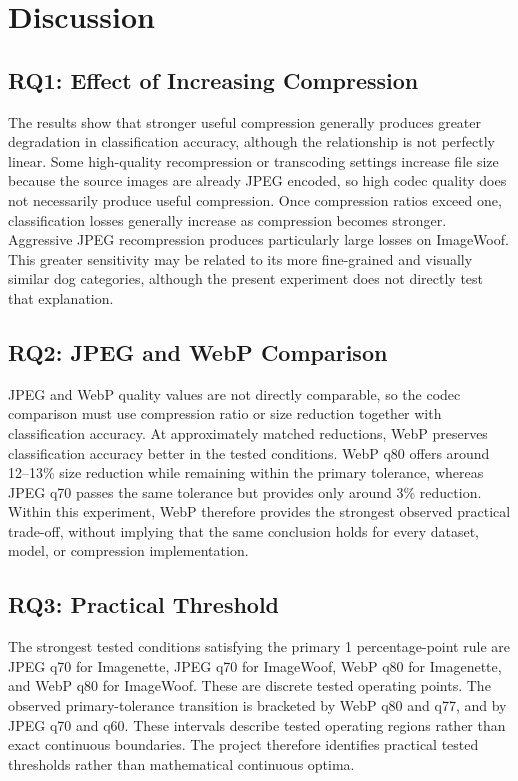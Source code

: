 \section{Discussion}

\subsection{RQ1: Effect of Increasing Compression}

The results show that stronger useful compression generally produces greater degradation in classification accuracy, although the relationship is not perfectly linear. Some high-quality recompression or transcoding settings increase file size because the source images are already JPEG encoded, so high codec quality does not necessarily produce useful compression. Once compression ratios exceed one, classification losses generally increase as compression becomes stronger. Aggressive JPEG recompression produces particularly large losses on ImageWoof. This greater sensitivity may be related to its more fine-grained and visually similar dog categories, although the present experiment does not directly test that explanation.

\subsection{RQ2: JPEG and WebP Comparison}

JPEG and WebP quality values are not directly comparable, so the codec comparison must use compression ratio or size reduction together with classification accuracy. At approximately matched reductions, WebP preserves classification accuracy better in the tested conditions. WebP q80 offers around 12--13\% size reduction while remaining within the primary tolerance, whereas JPEG q70 passes the same tolerance but provides only around 3\% reduction. Within this experiment, WebP therefore provides the strongest observed practical trade-off, without implying that the same conclusion holds for every dataset, model, or compression implementation.

\subsection{RQ3: Practical Threshold}

The strongest tested conditions satisfying the primary 1 percentage-point rule are JPEG q70 for Imagenette, JPEG q70 for ImageWoof, WebP q80 for Imagenette, and WebP q80 for ImageWoof. These are discrete tested operating points. The observed primary-tolerance transition is bracketed by WebP q80 and q77, and by JPEG q70 and q60. These intervals describe tested operating regions rather than exact continuous boundaries. The project therefore identifies practical tested thresholds rather than mathematical continuous optima.

